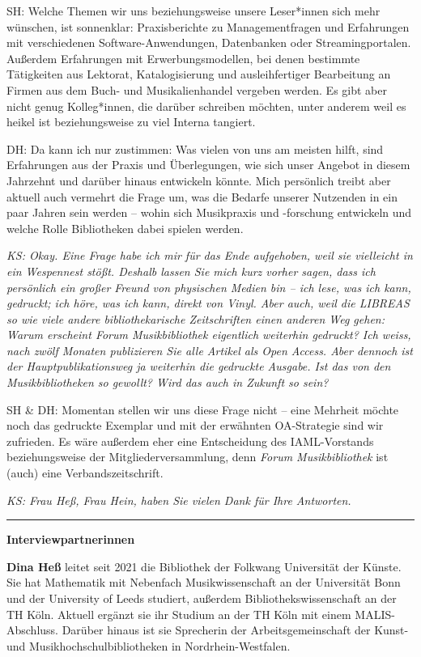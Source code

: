 \documentclass[a4paper,
fontsize=11pt,
oneside,
numbers=noperiodatend,
parskip=half-,
bibliography=totoc,
final
]{scrartcl}
\begin{document}
SH: Welche Themen wir uns beziehungsweise unsere Leser*innen sich mehr
wünschen, ist sonnenklar: Praxisberichte zu Managementfragen und
Erfahrungen mit verschiedenen Software-Anwendungen, Datenbanken oder
Streamingportalen. Außerdem Erfahrungen mit Erwerbungsmodellen, bei
denen bestimmte Tätigkeiten aus Lektorat, Katalogisierung und
ausleihfertiger Bearbeitung an Firmen aus dem Buch- und Musikalienhandel
vergeben werden. Es gibt aber nicht genug Kolleg*innen, die darüber
schreiben möchten, unter anderem weil es heikel ist beziehungsweise zu
viel Interna tangiert.

DH: Da kann ich nur zustimmen: Was vielen von uns am meisten hilft, sind
Erfahrungen aus der Praxis und Überlegungen, wie sich unser Angebot in
diesem Jahrzehnt und darüber hinaus entwickeln könnte. Mich persönlich
treibt aber aktuell auch vermehrt die Frage um, was die Bedarfe unserer
Nutzenden in ein paar Jahren sein werden -- wohin sich Musikpraxis und
\mbox{-forschung} entwickeln und welche Rolle Bibliotheken dabei spielen
werden.

\emph{KS: Okay. Eine Frage habe ich mir für das Ende aufgehoben, weil
sie vielleicht in ein Wespennest stößt. Deshalb lassen Sie mich kurz
vorher sagen, dass ich persönlich ein großer Freund von physischen
Medien bin -- ich lese, was ich kann, gedruckt; ich höre, was ich kann,
direkt von Vinyl. Aber auch, weil die LIBREAS so wie viele andere
bibliothekarische Zeitschriften einen anderen Weg gehen: Warum erscheint
Forum Musikbibliothek eigentlich weiterhin gedruckt? Ich weiss, nach
zwölf Monaten publizieren Sie alle Artikel als Open Access. Aber dennoch
ist der Hauptpublikationsweg ja weiterhin die gedruckte Ausgabe. Ist das
von den Musikbibliotheken so gewollt? Wird das auch in Zukunft so sein?}

SH \& DH: Momentan stellen wir uns diese Frage nicht -- eine Mehrheit
möchte noch das gedruckte Exemplar und mit der erwähnten OA-Strategie
sind wir zufrieden. Es wäre außerdem eher eine Entscheidung des
IAML-Vorstands beziehungsweise der Mitgliederversammlung, denn
\emph{Forum Musikbibliothek} ist (auch) eine Verbandszeitschrift.

\emph{KS: Frau Heß, Frau Hein, haben Sie vielen Dank für Ihre
Antworten.}

\begin{center}\rule{0.5\linewidth}{0.5pt}\end{center}

\textbf{Interviewpartnerinnen}

\textbf{Dina Heß} leitet seit 2021 die Bibliothek der Folkwang Universität der Künste. 
Sie hat Mathematik mit Nebenfach Musikwissenschaft an der Universität Bonn und 
der University of Leeds studiert, außerdem Bibliothekswissenschaft an der TH Köln. 
Aktuell ergänzt sie ihr Studium an der TH Köln mit einem MALIS-Abschluss. Darüber 
hinaus ist sie Sprecherin der Arbeitsgemeinschaft der Kunst- und Musikhochschulbibliotheken 
in Nordrhein-Westfalen.
\end{document}
